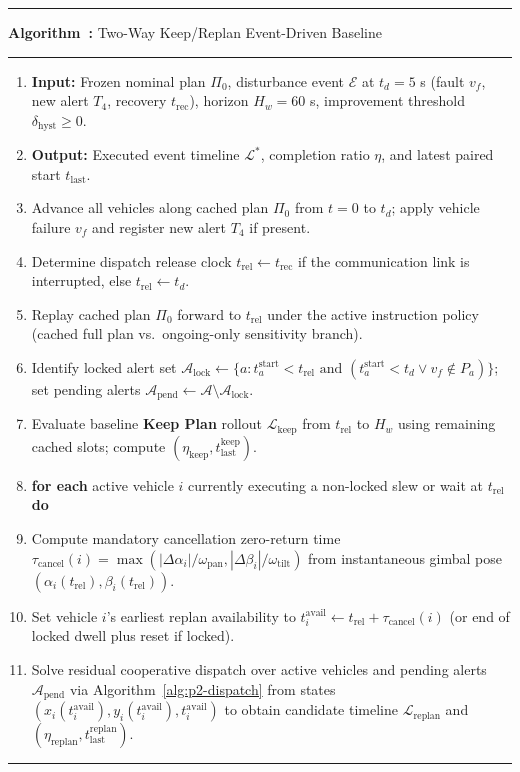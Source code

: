 \documentclass[12pt,a4paper]{article}
\newcounter{algonum}
\newenvironment{ieeealgo}[2]{%
  \refstepcounter{algonum}\label{#2}%
  \begin{tcolorbox}[
    float=htbp,
    colback=white,
    colframe=white,
    boxrule=0pt,
    arc=0pt,
    left=0pt,right=0pt,top=1pt,bottom=1pt,
    before skip=7pt,after skip=7pt
  ]
  \noindent\rule{\linewidth}{0.9pt}\par\vspace{2pt}
  \noindent\textbf{Algorithm~\thealgonum:} #1\par\vspace{2pt}
  \noindent\rule{\linewidth}{0.45pt}\par\vspace{3pt}
  \small
  \begin{enumerate}[leftmargin=2.0em,itemsep=1.1pt,topsep=1pt,parsep=0pt,label={\footnotesize\arabic*:}]
}{%
  \end{enumerate}
  \vspace{2pt}\noindent\rule{\linewidth}{0.9pt}
  \end{tcolorbox}
}
\begin{document}
\begin{ieeealgo}{Two-Way Keep/Replan Event-Driven Baseline}{alg:p4-reschedule}
\item \textbf{Input:} Frozen nominal plan $\Pi_0$, disturbance event $\mathcal{E}$ at $t_d=5$ s (fault $v_f$, new alert $T_4$, recovery $t_{\mathrm{rec}}$), horizon $H_w=60$ s, improvement threshold $\delta_{\mathrm{hyst}}\ge 0$.
\item \textbf{Output:} Executed event timeline $\mathcal{L}^*$, completion ratio $\eta$, and latest paired start $t_{\mathrm{last}}$.
\item Advance all vehicles along cached plan $\Pi_0$ from $t=0$ to $t_d$; apply vehicle failure $v_f$ and register new alert $T_4$ if present.
\item Determine dispatch release clock $t_{\mathrm{rel}}\leftarrow t_{\mathrm{rec}}$ if the communication link is interrupted, else $t_{\mathrm{rel}}\leftarrow t_d$.
\item Replay cached plan $\Pi_0$ forward to $t_{\mathrm{rel}}$ under the active instruction policy (cached full plan vs.\ ongoing-only sensitivity branch).
\item Identify locked alert set $\mathcal{A}_{\mathrm{lock}}\leftarrow\{a : t_a^{\mathrm{start}} < t_{\mathrm{rel}} \text{ and } (t_a^{\mathrm{start}} < t_d \lor v_f \notin P_a)\}$; set pending alerts $\mathcal{A}_{\mathrm{pend}}\leftarrow\mathcal{A}\setminus\mathcal{A}_{\mathrm{lock}}$.
\item Evaluate baseline \textbf{Keep Plan} rollout $\mathcal{L}_{\mathrm{keep}}$ from $t_{\mathrm{rel}}$ to $H_w$ using remaining cached slots; compute $(\eta_{\mathrm{keep}}, t_{\mathrm{last}}^{\mathrm{keep}})$.
\item \textbf{for each} active vehicle $i$ currently executing a non-locked slew or wait at $t_{\mathrm{rel}}$ \textbf{do}
\item \quad Compute mandatory cancellation zero-return time $\tau_{\mathrm{cancel}}(i)=\max(|\Delta\alpha_i|/\omega_{\mathrm{pan}},|\Delta\beta_i|/\omega_{\mathrm{tilt}})$ from instantaneous gimbal pose $(\alpha_i(t_{\mathrm{rel}}),\beta_i(t_{\mathrm{rel}}))$.
\item \quad Set vehicle $i$'s earliest replan availability to $t_i^{\mathrm{avail}}\leftarrow t_{\mathrm{rel}}+\tau_{\mathrm{cancel}}(i)$ (or end of locked dwell plus reset if locked).
\item Solve residual cooperative dispatch over active vehicles and pending alerts $\mathcal{A}_{\mathrm{pend}}$ via Algorithm~\ref{alg:p2-dispatch} from states $(x_i(t_i^{\mathrm{avail}}),y_i(t_i^{\mathrm{avail}}),t_i^{\mathrm{avail}})$ to obtain candidate timeline $\mathcal{L}_{\mathrm{replan}}$ and $(\eta_{\mathrm{replan}},t_{\mathrm{last}}^{\mathrm{replan}})$.

\end{ieeealgo}
\end{document}
